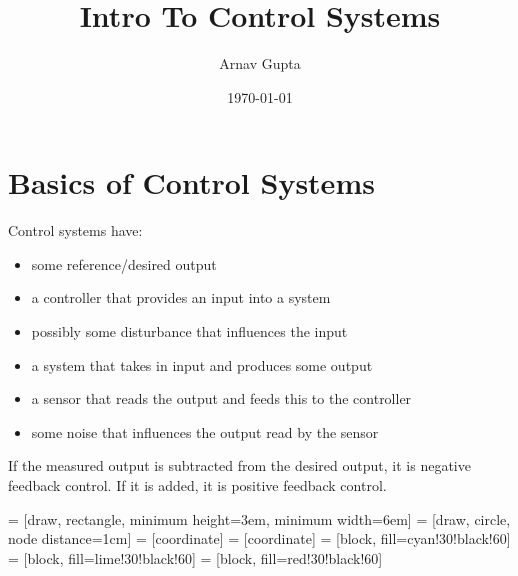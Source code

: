 \documentclass[11pt]{article}
\author{Arnav Gupta}
\date{\today}
\title{Intro To Control Systems}
\begin{document}
\maketitle
\tableofcontents

\section{Basics of Control Systems}
\label{sec:org490279a}
Control systems have:
\begin{itemize}
\item some reference/desired output
\item a controller that provides an input into a system
\item possibly some disturbance that influences the input
\item a system that takes in input and produces some output
\item a sensor that reads the output and feeds this to the controller
\item some noise that influences the output read by the sensor
\end{itemize}

If the measured output is subtracted from the desired output, it is
negative feedback control. If it is added, it is positive feedback
control.

 = [draw, rectangle, minimum height=3em, minimum width=6em]
 = [draw, circle, node distance=1cm]
 = [coordinate]
 = [coordinate]
 = [block, fill=cyan!30!black!60]
 = [block, fill=lime!30!black!60]
 = [block, fill=red!30!black!60]
\begin{center}
\end{center}
\end{document}
